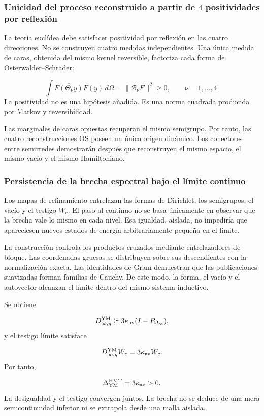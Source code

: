 \subsubsection{Unicidad del proceso reconstruido a partir de \(4\) positividades por reflexión}
La teoría euclídea debe satisfacer positividad por reflexión en las cuatro direcciones. No se construyen cuatro medidas independientes. Una única medida de caras, obtenida del mismo kernel reversible, factoriza cada forma de Osterwalder–Schrader:\par
\[
\int
\overline{F(\Theta_{\nu}y)}F(y)\,d\Omega
=
\|\mathcal B_\nu F\|^2
\ge0,
\qquad \nu=1,\ldots,4.
\]
La positividad no es una hipótesis añadida. Es una norma cuadrada producida por Markov y reversibilidad.\par
Las marginales de caras opuestas recuperan el mismo semigrupo. Por tanto, las cuatro reconstrucciones OS poseen un único origen dinámico. Los conectores entre semirredes demostrarán después que reconstruyen el mismo espacio, el mismo vacío y el mismo Hamiltoniano.\par
{}
\subsubsection{Persistencia de la brecha espectral bajo el límite continuo}
Los mapas de refinamiento entrelazan las formas de Dirichlet, los semigrupos, el vacío y el testigo \(W_c\). El paso al continuo no se basa únicamente en observar que la brecha vale lo mismo en cada nivel. Esa igualdad, aislada, no impediría que apareciesen nuevos estados de energía arbitrariamente pequeña en el límite.\par
La construcción controla los productos cruzados mediante entrelazadores de bloque. Las coordenadas gruesas se distribuyen sobre sus descendientes con la normalización exacta. Las identidades de Gram demuestran que las publicaciones suavizadas forman familias de Cauchy. De este modo, la forma, el vacío y el autovector alcanzan el límite dentro del mismo sistema inductivo.\par
Se obtiene\par
\[
D_{\infty,g}^{\rm YM}
\succeq
3\kappa_{\rm av}(I-P_{\Omega_\infty}),
\]
y el testigo límite satisface\par
\[
D_{\infty,g}^{\rm YM}W_c
=
3\kappa_{\rm av}W_c.
\]
Por tanto,\par
\[
\Delta_{\rm YM}^{\rm HMT}
=
3\kappa_{\rm av}>0.
\]
La desigualdad y el testigo convergen juntos. La brecha no se deduce de una mera semicontinuidad inferior ni se extrapola desde una malla aislada.\par
{}
